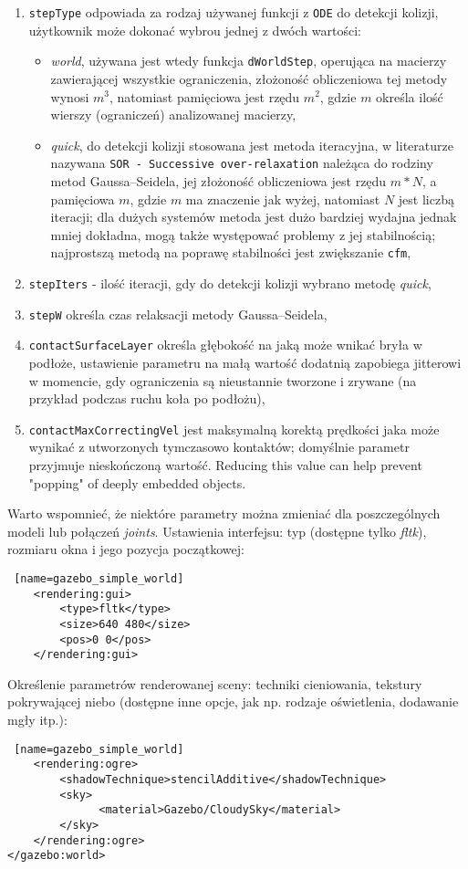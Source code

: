 \begin {enumerate}
	 \item \texttt{stepType} odpowiada za rodzaj używanej funkcji z \texttt{ODE} do detekcji kolizji, użytkownik może dokonać wybrou jednej z dwóch wartości:
	      \begin{itemize}
	       \item \textit{world}, używana jest wtedy funkcja \texttt{dWorldStep}, operująca na macierzy zawierającej wszystkie ograniczenia, złożoność obliczeniowa tej metody wynosi $m^3$, natomiast pamięciowa
jest rzędu $m^2$, gdzie $m$ określa ilość wierszy (ograniczeń) analizowanej macierzy,
	       \item \textit{quick}, do detekcji kolizji stosowana jest metoda iteracyjna, w literaturze nazywana \texttt{SOR - Successive over-relaxation} należąca do rodziny metod Gaussa–Seidela, jej złożoność obliczeniowa jest rzędu $m*N$,
		a pamięciowa $m$, gdzie $m$ ma znaczenie jak wyżej,
		natomiast $N$ jest liczbą iteracji; dla dużych systemów metoda jest dużo bardziej wydajna jednak mniej dokładna, mogą także występować problemy z jej stabilnością; najprostszą metodą na poprawę stabilności
		jest zwiększanie \texttt{cfm}, 
	      \end{itemize}
	 \item \texttt{stepIters} - ilość iteracji, gdy do detekcji kolizji wybrano metodę \textit{quick},
	 \item \texttt{stepW} określa czas relaksacji metody Gaussa–Seidela, 
	 \item \texttt{contactSurfaceLayer} określa głębokość na jaką może wnikać bryła w podłoże, ustawienie parametru na małą wartość dodatnią zapobiega jitterowi w momencie, gdy ograniczenia są nieustannie tworzone
	  i zrywane (na przykład podczas ruchu koła po podłożu),
	 \item \texttt{contactMaxCorrectingVel} jest maksymalną korektą prędkości jaka może wynikać z utworzonych tymczasowo kontaktów; domyślnie parametr przyjmuje nieskończoną wartość.
	  Reducing this value can help prevent "popping" of deeply embedded objects. 
	\end {enumerate}
	Warto wspomnieć, że niektóre parametry można zmieniać dla poszczególnych modeli lub połączeń \textit{joints}.\newline
	Ustawienia interfejsu: typ (dostępne tylko \textit{fltk}), rozmiaru okna i jego pozycja początkowej:
\begin{lstlisting} [name=gazebo_simple_world]
    <rendering:gui>
        <type>fltk</type>
        <size>640 480</size>
        <pos>0 0</pos>
    </rendering:gui>
\end{lstlisting}
	Określenie parametrów renderowanej sceny: techniki cieniowania, tekstury pokrywającej niebo (dostępne inne opcje, jak np. rodzaje oświetlenia, dodawanie mgły itp.):
\begin{lstlisting} [name=gazebo_simple_world]
    <rendering:ogre>
        <shadowTechnique>stencilAdditive</shadowTechnique>
        <sky>
              <material>Gazebo/CloudySky</material>
        </sky>
    </rendering:ogre>
</gazebo:world>
\end{lstlisting}

